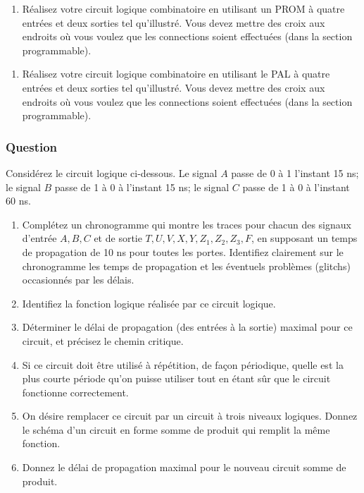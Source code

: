 \documentclass[11pt]{article}
\begin{document}
\begin{enumerate}
\item Réalisez votre circuit logique combinatoire en utilisant un PROM à
quatre entrées et deux sorties tel qu'illustré.
Vous devez mettre des croix aux endroits où vous voulez que les
connections soient effectuées (dans la section programmable).
\end{enumerate}
\begin{center}

\end{center}

\begin{enumerate}
\item Réalisez votre circuit logique combinatoire en utilisant le PAL à
quatre entrées et deux sorties tel qu'illustré.
Vous devez mettre des croix aux endroits où vous voulez que les
connections soient effectuées (dans la section programmable).
\end{enumerate}
\begin{center}

\end{center}

\subsubsection*{Question}
\label{sec:org631004d}
Considérez le circuit logique ci-dessous. Le signal \(A\) passe de 0 à 1
l'instant 15 ns; le signal \(B\) passe de 1 à 0 à l'instant 15 ns; le
signal \(C\) passe de 1 à 0 à l'instant 60 ns.
\begin{center}

\end{center}

\begin{enumerate}
\item Complétez un chronogramme qui montre les traces pour chacun des
signaux d'entrée \(A, B, C\) et de sortie \(T, U, V, X, Y, Z_1,
       Z_2, Z_3, F\), en supposant un temps de propagation de 10 ns
pour toutes les portes. Identifiez clairement sur le
chronogramme les temps de propagation et les éventuels problèmes
(glitchs) occasionnés par les délais.

\item Identifiez la fonction logique réalisée par ce circuit logique.

\item Déterminer le délai de propagation (des entrées à la sortie)
maximal pour ce circuit, et précisez le chemin critique.

\item Si ce circuit doit être utilisé à répétition, de façon périodique,
quelle est la plus courte période qu'on puisse utiliser tout en
étant sûr que le circuit fonctionne correctement.

\item On désire remplacer ce circuit par un circuit à trois niveaux
logiques. Donnez le schéma d'un circuit en forme somme de produit
qui remplit la même fonction.

\item Donnez le délai de propagation maximal pour le nouveau circuit
somme de produit.
\end{enumerate}
\end{document}
